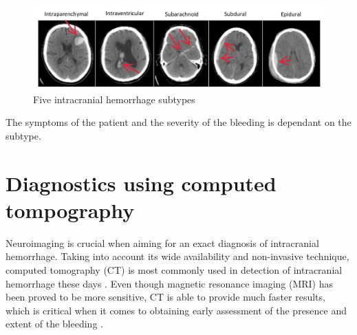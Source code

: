 \begin{figure}[h]
\begin{centering}
\includegraphics[width=15cm]{assets/images/subtypes}
\par\end{centering}
\caption{Five intracranial hemorrhage subtypes \label{fig:subtypes}}
\end{figure}

The symptoms of the patient and the severity of the bleeding is dependant on the subtype. 

\section{Diagnostics using computed tompography}
Neuroimaging is crucial when aiming for an exact diagnosis of intracranial hemorrhage.  Taking into account its wide availability and non-invasive technique, computed tomography (CT) is most commonly used in detection of intracranial hemorrhage these days \cite{imagingICH}. Even though magnetic resonance imaging (MRI) has been proved to be more sensitive, CT is able to provide much faster results, which is critical when it comes to obtaining early assessment of the presence and extent of the bleeding \cite{imagingAfterBrainInjury}.
